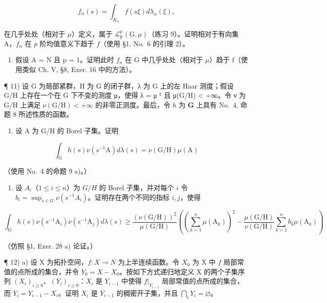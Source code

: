 \[
f _ {\alpha} (s) = \int_ {K _ {\alpha}} f (s \xi) d \lambda_ {\alpha} (\xi),
\]

在几乎处处（相对于 \(\mu\)）定义，属于 \(\mathcal{L}_{\mathrm{F}}^{p}(\mathrm{G},\mu)\)（练习 9）。证明相对于有向集 A，\(f_{\alpha}\) 在 \(p\) 阶均值意义下趋于 \(f\)（使用 §1, No.~6 的引理 2）。

\begin{enumerate}
\def\labelenumi{\alph{enumi})}
\setcounter{enumi}{1}
\tightlist
\item
  假设 A = N 且 p = 1。证明此时 \(f_{n}\) 在 G 中几乎处处（相对于 \(\mu\)）趋于 f（使用类似 Ch. V, §8, Exer. 16 中的方法）。
\end{enumerate}

¶ 11) 设 G 为局部紧群，H 为 G 的闭子群，λ 为 G 上的左 Haar 测度；假设 G/H 上存在一个在 G 下不变的测度 μ，使得 λ = μ \(^{\sharp}\) 且 μ(G/H) \textless{} +∞。令 ν 为 G/H 上满足 \(\nu (\mathrm{G / H}) < +\infty\) 的非零正测度。最后，令 \(h\) 为 \(\mathbf{G}\) 上具有 No.~4, 命题 8 所述性质的函数。

\begin{enumerate}
\def\labelenumi{\alph{enumi})}
\tightlist
\item
  设 A 为 G/H 的 Borel 子集。证明
\end{enumerate}

\[
\int_ {\mathrm{G}} h (s) \nu (s ^ {- 1} \mathrm{A}) d \lambda (s) = \nu (\mathrm{G/H}) \mu (\mathrm{A})
\]

（使用 No.~4 的命题 9 a)。）

\begin{enumerate}
\def\labelenumi{\alph{enumi})}
\setcounter{enumi}{1}
\tightlist
\item
  设 \(A_i\)（\(1 \leqslant i \leqslant n\)）为 \(G / H\) 的 Borel 子集，并对每个 \(i\) 令 \(b_i = \sup_{s \in G} \nu(s^{-1} A_i)\)。证明存在两个不同的指标 \(i, j\)，使得
\end{enumerate}

\[
\int_ {\mathrm{G}} h (s) \nu (s ^ {- 1} \mathrm{A} _ {i}) \nu (s ^ {- 1} \mathrm{A} _ {j}) d \lambda (s) \geqslant \frac {\left(\nu (\mathrm{G} / \mathrm{H})\right) ^ {2}}{\mu (\mathrm{G} / \mathrm{H})} \left(\left(\sum_ {k = 1} ^ {n} \mu (\mathrm{A} _ {k})\right) ^ {2} - \frac {\mu (\mathrm{G} / \mathrm{H})}{\nu (\mathrm{G} / \mathrm{H})} \sum_ {k = 1} ^ {n} b _ {k} \mu (\mathrm{A} _ {k})\right)
\]

（仿照 §1, Exer. 28 a) 论证。）

¶ 12) a) 设 X 为拓扑空间，\(f: X \to N\) 为上半连续函数。令 \(X_0\) 为 X 中 \(f\) 局部常值的点所成的集合，并令 \(Y_0 = X - X_0\)。按如下方式递归地定义 X 的两个子集序列 \((X_i)_{i \geqslant 0}\)、\((Y_i)_{i \geqslant 0}\)：\(X_i\) 是 \(Y_{i-1}\) 中使得 \(f|_{Y_{i-1}}\) 局部常值的点所成的集合，而 \(Y_i = Y_{i-1} - X_i\)。证明 \(X_i\) 是 \(Y_{i-1}\) 的稠密开子集，并且 \(\bigcap_i Y_i = \varnothing\)。

